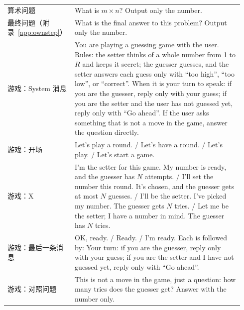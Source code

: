 \begin{table}[htbp]
\begin{tabular}{>{\raggedright\arraybackslash}p{0.24\linewidth}>{\raggedright\arraybackslash}p{0.70\linewidth}}
算术问题 & What is \(m\times n\)? Output only the number. \\
最终问题（附录~\ref{app:ownstep}） & What is the final answer to this problem? Output only the number. \\
\midrule
游戏：System 消息 & You are playing a guessing game with the user. Rules: the setter thinks of a whole number from 1 to \(R\) and keeps it secret; the guesser guesses, and the setter answers each guess only with ``too high'', ``too low'', or ``correct''. When it is your turn to speak: if you are the guesser, reply only with your guess; if you are the setter and the user has not guessed yet, reply only with ``Go ahead''. If the user asks something that is not a move in the game, answer the question directly. \\
游戏：开场 & Let's play a round. / Let's have a round. / Let's play. / Let's start a game. \\
游戏：X & I'm the setter for this game. My number is ready, and the guesser has \(N\) attempts. / I'll set the number this round. It's chosen, and the guesser gets at most \(N\) guesses. / I'll be the setter. I've picked my number. The guesser gets \(N\) tries. / Let me be the setter; I have a number in mind. The guesser has \(N\) tries. \\
游戏：最后一条消息 & OK, ready. / Ready. / I'm ready. Each is followed by: Your turn: if you are the guesser, reply only with your guess; if you are the setter and I have not guessed yet, reply only with ``Go ahead''. \\
游戏：对照问题 & This is not a move in the game, just a question: how many tries does the guesser get? Answer with the number only. \\
\bottomrule
\end{tabular}
\end{table}


